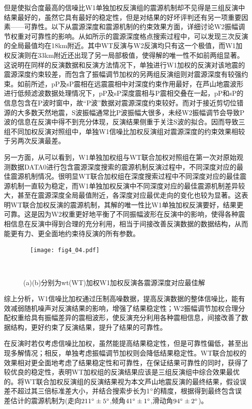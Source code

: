 但是使拟合度最高的信噪比W1单独加权反演组的震源机制却不见得是三组反演中结果最好的，虽然它具有最好的稳定性，但是对结果的好坏评判还有另一项重要因素——可靠性。以下从震源深度和震源机制的约束效果方面，详细讨论W2振幅调节权重对可靠性的影响。从如所示的震源深度格点搜索过程中，可以发现三次反演的全局最值均在18km附近。其中WT反演与W2反演均只有这一个极值，而W1加权反演则在33km附近还出现了另一局部极值，使得解的唯一性不如前两组显著。这说明在同样的反演数据和反演方法情况下，单独进行W1加权的反演对该地震的震源深度约束较差，而包含了振幅调节加权的另两组反演组则对震源深度有较强约束。如前所述，pP及sP震相在远震震相中对深度约束作用最好，在芦山地震波形进行低频滤波数据处理情况下，pP及sP深度震相与P震相交叠在一起，pP和sP的信息包含在P波时窗中，故“P波”数据对震源深度约束较好。而对于接近剪切位错源的大多数天然地震，S波振幅通常比P波振幅大很多，未经W2振幅调节会导致P波的信息在反演中得不到充分体现，反演结果侧重于关注S波的拟合。因而导致三组不同加权反演对照组中，单独W1信噪比加权反演组对震源深度的约束效果相较于另两次反演最差。

另一方面，从可以看到，W1单独加权组与WT联合加权对照组在第一次对原始观测数据DATA0进行包含震源深度搜索的震源机制反演过程中，不同深度对应的最佳震源机制情况。很明显WT联合加权组在深度搜索过程中不同深度对应的最佳震源机制一直较为稳定，而W1单独加权反演中不同深度对应的最佳震源机制差异较大，甚至在震源深度全局最值附近，各深度对应最优走向的变化也较为显著。这表明WT联合加权反演的震源机制，其解的唯一性比W1单独加权反演要好，结果更可靠。这是因为W2权重更好地平衡了不同振幅波形在反演中的影响，使得各种震相信息在反演中得到合理的充分利用，相当于间接改善反演数据的数据结构，从而能更有力、更全面地约束待反演的所有参数。
\begin{figure}
\centering
  \texttt{[image: fig4\_04.pdf]}
  \caption{ (a)(b)分别为wt(WT)加权W1加权反演各震源深度对应最佳解}
  \label{fig4_04}
\end{figure}

综上分析，W1信噪比加权通过压制高噪数据，提高反演数据的整体信噪比，能有效减弱随机噪声对反演结果的影响，增强了结果稳定性；W2振幅调节加权合理分配权重给具有振幅差异的震相波形，使反演充分利用各种震相信息，间接改善了数据结构，更好约束了反演结果，提升了结果的可靠性。

在反演时若仅考虑信噪比加权，虽然能提高结果稳定性，但是可靠性偏低，甚至出现多解情况；相反，单独考虑振幅调节加权则会降低结果稳定性。WT联合加权的效果相对更全面地考虑了结果稳定性和可靠性，在保证结果可靠性的同时，获得了较优良的稳定性，表明WT加权组的反演结果应该是三组反演组中综合效果最优的。将WT联合加权反演组的反演结果视为本文芦山地震反演的最终结果，假设误差不超过其三倍标准差大小，并结合搜索步长为1$^\circ$的精度，根据得到最终包含误差估计的震源机制为(走向$211^\circ\pm5^\circ$,倾角$41^\circ\pm1^\circ$,滑动角$94^\circ\pm2^\circ$)。

